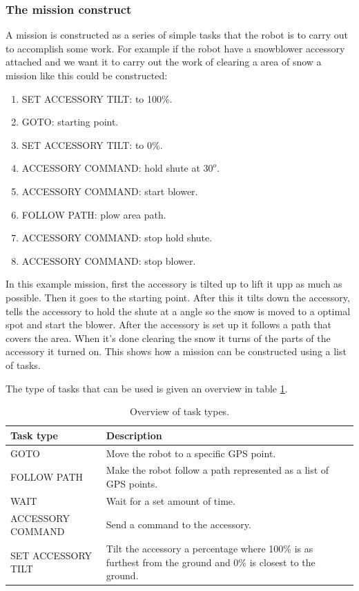 \documentclass{article}
\begin{document}
\subsubsection{The mission construct}
\label{sec:mission}

A mission is constructed as a series of simple tasks that the robot is to carry out to accomplish some work.
For example if the robot have a snowblower accessory attached and we want it to carry out the work of clearing a area of snow a mission like this could be constructed:
\begin{enumerate}
    \item SET ACCESSORY TILT: to 100\%.
    \item GOTO: starting point.
    \item SET ACCESSORY TILT: to 0\%.
    \item ACCESSORY COMMAND: hold shute at $30^o$.
    \item ACCESSORY COMMAND: start blower.
    \item FOLLOW PATH: plow area path.
    \item ACCESSORY COMMAND: stop hold shute.
    \item ACCESSORY COMMAND: stop blower.
\end{enumerate}
In this example mission, first the accessory is tilted up to lift it upp as much as possible.
Then it goes to the starting point. After this it tilts down the accessory, tells the accessory to hold the shute at a angle so the snow is moved to a optimal spot and start the blower.
After the accessory is set up it follows a path that covers the area. When it's done clearing the snow it turns of the parts of the accessory it turned on.
This shows how a mission can be constructed using a list of tasks.

The type of tasks that can be used is given an overview in table \ref{tab:task_types_over}.
\begin{table}[H]
    \centering
    \begin{tabular}{| m{3cm} | m{5cm} |}
        \hline
        Task type & Description \\
        \hline \hline
        GOTO & Move the robot to a specific GPS point. \\
        \hline
        FOLLOW PATH & Make the robot follow a path represented as a list of GPS points. \\
        \hline
        WAIT & Wait for a set amount of time. \\
        \hline
        ACCESSORY COMMAND & Send a command to the accessory. \\
        \hline
        SET ACCESSORY TILT & Tilt the accessory a percentage where 100\% is as furthest from the ground and 0\% is closest to the ground. \\
        \hline
    \end{tabular}
    \caption{Overview of task types.}
    \label{tab:task_types_over}
\end{table}
\end{document}

